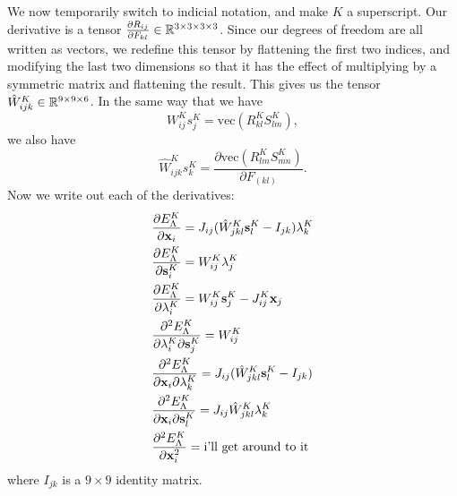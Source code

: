 We now temporarily switch to indicial notation, and make $K$ a superscript. Our derivative is a tensor $\frac{\partial R_{ij}}{\partial F_{kl}} \in \mathbb{R}^{3 \times 3 \times 3 \times 3}$. Since our degrees of freedom are all written as vectors, we redefine this tensor by flattening the first two indices, and modifying the last two dimensions so that it has the effect of multiplying by a symmetric matrix and flattening the result. This gives us the tensor $\hat{W}^K_{ijk} \in \mathbb{R}^{9 \times 9 \times 6}$. In the same way that we have
\begin{equation}
W^K_{ij}s^K_j = \text{vec}(R^K_{kl} S^K_{lm}),
\end{equation}
we also have
\begin{equation}
\hat{W}^K_{ijk}s^K_{k} = \frac{\partial \text{vec}(R^K_{lm}S^K_{mn})}{\partial F_{(kl)}}.
\end{equation}
Now we write out each of the derivatives:
\begin{align}
&\frac{\partial E_\Lambda^K}{\partial \mathbf{x}_i} = 
J_{ij}(\hat{W}^K_{jkl}\mathbf{s}^K_l - I_{jk})\mathbf{\lambda}^K_k \\
&\frac{\partial E_\Lambda^K}{\partial \mathbf{s}^K_i}  = 
W_{ij}^K \mathbf{\lambda}^K_{j} \\
&\frac{\partial E_\Lambda^K}{\partial \mathbf{\lambda}^K_i} = 
W_{ij}^K \mathbf{s}^{K}_j - J_{ij}^K \mathbf{x}_j \\
&\frac{\partial^2 E_\Lambda^K}{\partial \mathbf{\lambda}^K_i \partial \mathbf{s}^K_j} =
W^K_{ij} \\
&\frac{\partial^2 E_\Lambda^K}{\partial \mathbf{x}_i \partial \mathbf{\lambda}^K_k} =
J_{ij}(\hat{W}^K_{jkl}\mathbf{s}^K_l - I_{jk}) \\
&\frac{\partial^2 E_\Lambda^K}{\partial \mathbf{x}_i \partial \mathbf{s}_l^K} =
J_{ij}\hat{W}^K_{jkl}\mathbf{\lambda}^K_k \\
&\frac{\partial^2 E_\Lambda^K}{\partial \mathbf{x}_i^2} =
\text{i'll get around to it} \\
\end{align}
where $I_{jk}$ is a $9 \times 9$ identity matrix.
